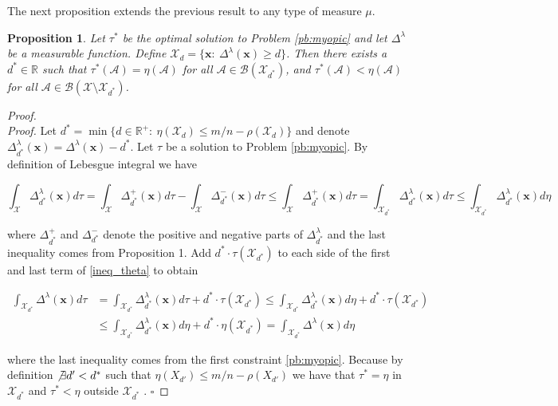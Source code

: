 \documentclass[12pt,a4paper]{article}
\newtheorem{proposition}{Proposition}
\newcommand{\bx}{\mathbf{x}}
\newcommand{\mA}{\mathcal{A}}
\newcommand{\mX}{\mathcal{X}}
\newcommand{\mB}{\mathcal{B}}
\begin{document}
		
		The next proposition extends the previous result to any type of measure $\mu$.
		
		\begin{proposition} \label{prop:knapsack_continuous}
			Let $\tau^*$ be the optimal solution to Problem \eqref{pb:myopic} and let $\Delta^\lambda$ be a measurable function. Define $\mathcal{X}_{d}=\{\bx: \ \Delta^\lambda(\bx) \geq d\}$. Then there exists a $d^*\in \mathbb{R}$ such that $\tau^*(\mA)=\eta(\mA)$ for all $\mA \in \mB(\mathcal{X}_{d^*})$, and $\tau^*(\mA)<\eta(\mA)$ for all $\mA \in \mB(\mX \setminus \mathcal{X}_{d^*})$.
		\end{proposition}
		
		\begin{proof}\\
			{\it Proof.}
			Let $d^*=\min \{ d \in \mathbb{R}^+: \ \eta(\mX_{d})\leq m/n-\rho(\mX_{d}) \}$ and denote $\Delta^\lambda_{d^*}(\bx)=\Delta^\lambda(\bx)-d^*$. Let $\tau$ be a solution to Problem \eqref{pb:myopic}. By definition of Lebesgue integral we have
			
			\begin{equation}
				\int_\mX \Delta^\lambda_{d^*}(\bx) d\tau=\int_\mX \Delta_{d^*}^+(\bx) d\tau - \int_\mX \Delta_{d^*}^-(\bx) d\tau \leq  \int_\mX \Delta_{d^*}^+(\bx)  d\tau =\int_{\mX_{d^*}} \Delta^\lambda_{d^*}(\bx) d\tau \leq \int_{\mX_{d^*}} \Delta^\lambda_{d^*}(\bx) d\eta
				\label{ineq_theta}
			\end{equation}
			
			\noindent where $\Delta_{d^*}^+$ and $\Delta_{d^*}^-$ denote the positive and negative parts of $\Delta^\lambda_{d^*}$ and the last inequality comes from Proposition 1. Add $d^* \cdot \tau(\mX_{d^*})$ to each side of the first and last term of \eqref{ineq_theta} to obtain 
			
			\begin{align*}
				\int_{\mX_{d^*}} \Delta^\lambda(\bx) d\tau&=\int_{\mX_{d^*}} \Delta^\lambda_{d^*}(\bx) d\tau+d^* \cdot\tau(\mX_{d^*})  \leq \int_{\mX_{d^*}} \Delta^\lambda_{d^*}(\bx) d\eta +d^* \cdot\tau(\mX_{d^*})\\
				& \leq \int_{\mX_{d^*}} \Delta^\lambda_{d^*}(\bx) d\eta +d^*\cdot \eta(\mX_{d^*})=\int_{\mX_{d^*}} \Delta^\lambda(\bx) d\eta
			\end{align*}
			
			\noindent where the last inequality comes from the first constraint \eqref{pb:myopic}. Because by definition $\not\exists d'<d^*$ such that $\eta(X_{d'})\leq m/n -\rho(X_{d'})$ we have that  $\tau^*=\eta$ in $\mX_{d^*}$ and  $\tau^*<\eta$ outside $\mX_{d^*}$ . \hfill $\square$
			
		\end{proof}
		
\end{document}
